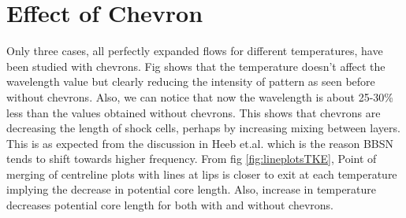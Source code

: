 \section{Effect of Chevron}  

Only three cases, all perfectly expanded flows for different temperatures, have been studied with chevrons. Fig shows that the temperature doesn't affect the wavelength value but clearly reducing the intensity of pattern as seen before without chevrons. Also, we can notice that now the wavelength is about 25-30\% less than the values obtained without chevrons. This shows that chevrons are decreasing the length of shock cells, perhaps by increasing mixing between layers. This is as expected from the discussion in Heeb et.al.\cite{heeb} which is the reason BBSN tends to shift towards higher frequency. From fig \ref{fig:lineplotsTKE}, Point of merging of centreline plots  with lines at lips is closer to exit at each temperature implying the decrease in potential core length. Also, increase in temperature decreases potential core length for both with and without chevrons. 

